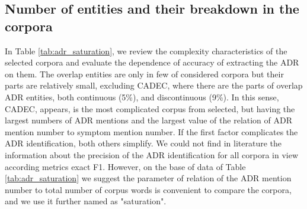 \documentclass[a4paper,fleqn,longmktitle]{cas-dc}
\begin{document}
\subsection{Number of entities and their breakdown in the corpora}
In Table \ref{tab:adr_saturation}, we review the complexity characteristics of the selected corpora and evaluate the dependence of accuracy of extracting the ADR on them.
The overlap entities  are  only in few  of considered corpora but   their parts are relatively small, excluding CADEC, where there are the parts of overlap ADR entities, both continuous (5\%), and discontinuous (9\%). 
In this sense, CADEC, appears, is the most complicated corpus from selected, but having the largest numbers of ADR mentions and the largest value of the relation of ADR mention number to symptom  mention number. If the first factor complicates  the ADR identification, both others simplify. We could not find in literature the information  about  the  precision of the ADR  identification for all  corpora in view according metrics exact F1. However, on the base of data of Table \ref{tab:adr_saturation} we suggest the parameter of relation of the ADR mention number  to total number of corpus words is convenient to compare  the corpora, and we use it further named as "saturation".

\end{document}
